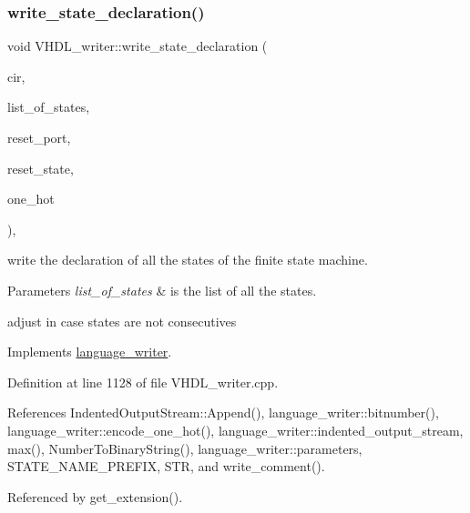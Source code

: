 \subsubsection{\texorpdfstring{write\+\_\+state\+\_\+declaration()}{write\_state\_declaration()}}
{\footnotesize\ttfamily void V\+H\+D\+L\+\_\+writer\+::write\+\_\+state\+\_\+declaration (\begin{DoxyParamCaption}\item[{const \hyperlink{structural__objects_8hpp_a8ea5f8cc50ab8f4c31e2751074ff60b2}{structural\+\_\+object\+Ref} \&}]{cir,  }\item[{const std\+::list$<$ std\+::string $>$ \&}]{list\+\_\+of\+\_\+states,  }\item[{const std\+::string \&}]{reset\+\_\+port,  }\item[{const std\+::string \&}]{reset\+\_\+state,  }\item[{bool}]{one\+\_\+hot }\end{DoxyParamCaption})\hspace{0.3cm}{\ttfamily [override]}, {\ttfamily [virtual]}}



write the declaration of all the states of the finite state machine. 


\begin{DoxyParams}{Parameters}
{\em list\+\_\+of\+\_\+states} & is the list of all the states. \\
\hline
\end{DoxyParams}
adjust in case states are not consecutives 

Implements \hyperlink{classlanguage__writer_a3325b6d77049e7f4bf39b1c4758df5e8}{language\+\_\+writer}.



Definition at line 1128 of file V\+H\+D\+L\+\_\+writer.\+cpp.



References Indented\+Output\+Stream\+::\+Append(), language\+\_\+writer\+::bitnumber(), language\+\_\+writer\+::encode\+\_\+one\+\_\+hot(), language\+\_\+writer\+::indented\+\_\+output\+\_\+stream, max(), Number\+To\+Binary\+String(), language\+\_\+writer\+::parameters, S\+T\+A\+T\+E\+\_\+\+N\+A\+M\+E\+\_\+\+P\+R\+E\+F\+IX, S\+TR, and write\+\_\+comment().



Referenced by get\+\_\+extension().

